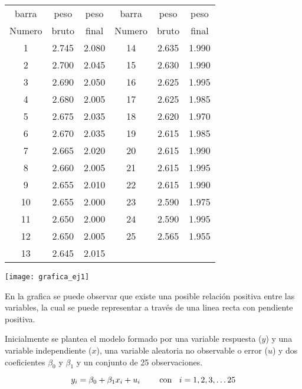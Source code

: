 \documentclass[base=hide,12pt]{elegantbook}
\begin{document}
	\begin{center}
		\begin{tabular}{ccc|ccc}
			\hline
			barra  & peso   & peso & barra  & peso   & peso \\
			Numero & bruto  & final& Numero & bruto  & final \\ 
			\hline
			1      & 2.745  & 2.080 & 14     & 2.635  & 1.990 \\
			2      & 2.700  & 2.045 & 15     & 2.630  & 1.990 \\
			3      & 2.690  & 2.050 & 16     & 2.625  &1.995 \\
			4      & 2.680  & 2.005 & 17     & 2.625  &1.985 \\ 
			5      & 2.675  & 2.035 & 18     & 2.620  &1.970 \\
			6      & 2.670  & 2.035 & 19     & 2.615  &1.985 \\
			7      & 2.665  & 2.020 & 20     & 2.615  &1.990 \\
			8      & 2.660  & 2.005 & 21     & 2.615  &1.995 \\
			9      & 2.655  & 2.010 & 22     & 2.615  & 1.990 \\
			10     & 2.655  & 2.000 & 23     & 2.590  &1.975 \\
			11     & 2.650  & 2.000 & 24     & 2.590  &1.995 \\
			12     & 2.650  & 2.005 & 25     & 2.565  &1.955 \\
			13     & 2.645  & 2.015 & &&\\
			\hline
		\end{tabular}
	\end{center}
	
	\begin{center}
		\texttt{[image: grafica\_ej1]}
	\end{center}
	
En la grafica se puede observar que existe una posible relación positiva entre las variables, la cual se puede representar a través de una linea recta con pendiente positiva.

Inicialmente se plantea el modelo formado por una variable respuesta ($y$) y una variable independiente ($x$), una variable aleatoria no observable o error ($u$)	y  dos coeficientes $\beta_{0}$ y $\beta_{1}$ y un conjunto de 25 observaciones. 
	
	
	$$y_{i}=\beta_{0}+\beta_{1}x_{i}+u_{i} \hspace{.7cm}\text{ con }\hspace{.2cm} i=1,2,3,\dots 25$$
	
\end{document}
